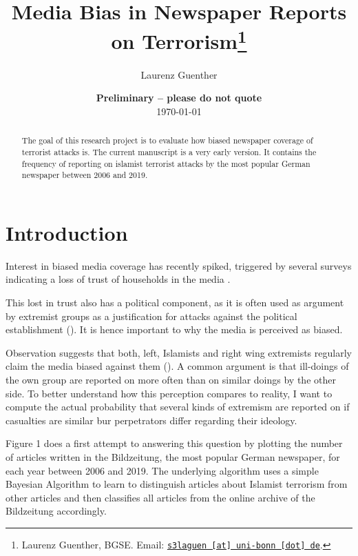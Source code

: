 \documentclass[11pt, a4paper, leqno]{article}
\begin{document}
	
	\title{Media Bias in Newspaper Reports on Terrorism\thanks{Laurenz Guenther, BGSE. Email: \href{mailto:s3laguen@uni-bonn.de}{\nolinkurl{s3laguen [at] uni-bonn [dot] de}}.}}
	
	\author{Laurenz Guenther}
	
	\date{
		{\bf Preliminary -- please do not quote} 
		\\[1ex] 
		\today
	}
	
	\maketitle
	
	
	\begin{abstract}
		The goal of this research project is to evaluate how biased newspaper coverage of terrorist attacks is. The current manuscript is a very early version. It contains the frequency of reporting on islamist terrorist attacks by the most popular German newspaper between 2006 and 2019. 
	\end{abstract}
	\clearpage
	
	\section{Introduction} %
	\label{sec:introduction}



Interest in biased media coverage has recently spiked, triggered by several surveys indicating a loss of trust of households in the media \cite{puglisi2015empirical}. 

This lost in trust also has a political component, as it is often used as argument by extremist groups as a justification for attacks against the political establishment (\cite{schellenberg2016lugenpress}). It is hence important to why the media is perceived as biased.

Observation suggests that both, left, Islamists and right wing extremists regularly claim the media biased against them (\cite{groseclose2005measure}). A common argument is that ill-doings of the own group are reported on more often than on similar doings by the other side. To better understand how this perception compares to reality, I want to compute the actual probability that several kinds of extremism are reported on if casualties are similar bur perpetrators differ regarding their ideology.



Figure 1 does a first attempt to answering this question by plotting the number of articles written in the Bildzeitung, the most popular German newspaper, for each year between 2006 and 2019. The underlying algorithm uses a simple Bayesian Algorithm to learn to distinguish articles about Islamist terrorism from other articles and then classifies all articles from the online archive of the Bildzeitung accordingly.
\end{document}
